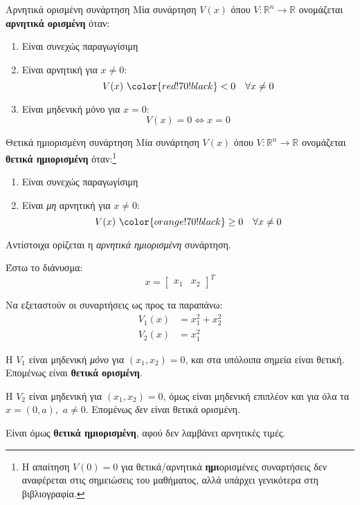 \documentclass[11pt,a4paper,notitlepage,fleqn]{article}
\begin{document}
\begin{defn}{Αρνητικά ορισμένη συνάρτηση}{}
	Μία συνάρτηση \( V(x) \) όπου \( V: \mathbb R^n \to \mathbb R \) ονομάζεται \textbf{αρνητικά
		ορισμένη} όταν:
	\begin{enumerate}
		\item Είναι συνεχώς παραγωγίσιμη
		\item Είναι {\color{red!70!black}αρνητική} για \( x\neq 0 \):
		\[
		V(x) ~ {\color{red!70!black}< 0} \quad \forall x\neq 0
		\]
		\item Είναι μηδενική μόνο για \( x=0 \):
		\[
		V(x) = 0 \iff x=0
		\]
	\end{enumerate}
\end{defn}

\begin{defn}{Θετικά ημιορισμένη συνάρτηση}{}
	Μία συνάρτηση \( V(x) \) όπου \( V: \mathbb R^n \to \mathbb R \) ονομάζεται \textbf{θετικά
		ημιορισμένη} όταν:\footnote{Η απαίτηση \( V(0) = 0 \) για θετικά/αρνητικά \textbf{ημι}ορισμένες συναρτήσεις δεν αναφέρεται στις σημειώσεις του
		μαθήματος, αλλά υπάρχει γενικότερα στη βιβλιογραφία.}
	\begin{enumerate}
		\item Είναι συνεχώς παραγωγίσιμη
		\item Είναι {\color{orange!70!black}\textit{μη} αρνητική} για \( x\neq 0 \):
		\[
		V(x) ~ {\color{orange!70!black}\geq 0} \quad \forall x\neq 0
		\]

	\end{enumerate}
\end{defn}
Αντίστοιχα ορίζεται η \textit{αρνητικά ημιορισμένη} συνάρτηση.

\begin{exercise}[Παράδειγμα]
	Έστω το διάνυσμα:
	\[
	x = \left[\begin{matrix}
	x_1 & x_2
	\end{matrix}\right]^T
	\]

	Να εξεταστούν οι συναρτήσεις ως προς τα παραπάνω:
	\begin{align*}
		V_1(x) &= x_1^2 + x_2^2 \\
		V_2(x) &= x_1^2
	\end{align*}
	\tcblower
	\begin{enumparen}
		\item Η \( V_1 \) είναι μηδενική \textit{μόνο} για \( (x_1,x_2) = 0 \),
		και στα υπόλοιπα σημεία είναι θετική. Επομένως είναι \textbf{θετικά ορισμένη}.
		\item Η \( V_2 \) είναι μηδενική για \( (x_1,x_2) = 0\), όμως είναι μηδενική επιπλέον και για όλα
		τα \( x= (0,a), \) \quad \( a \neq 0 \). Επομένως \textit{δεν} είναι θετικά ορισμένη.

		Είναι όμως \textbf{θετικά ημιορισμένη}, αφού δεν λαμβάνει
		αρνητικές τιμές.
	\end{enumparen}
\end{exercise}
\end{document}

